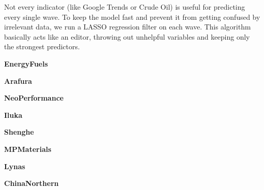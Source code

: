 \documentclass[11pt,a4paper]{article}
\begin{document}
Not every indicator (like Google Trends or Crude Oil) is useful for predicting every single wave. To keep the model fast and prevent it from getting confused by irrelevant data, we run a LASSO regression filter on each wave. This algorithm basically acts like an editor, throwing out unhelpful variables and keeping only the strongest predictors.

\begin{table}[H]
    \caption{LASSO Feature Selection Grid}
    \begin{minipage}{0.48\textwidth} \centering \textbf{EnergyFuels} \resizebox{\linewidth}{!}{  } \end{minipage}\hfill
    \begin{minipage}{0.48\textwidth} \centering \textbf{Arafura} \resizebox{\linewidth}{!}{  } \end{minipage}
    \vspace{0.5em}

    \begin{minipage}{0.48\textwidth} \centering \textbf{NeoPerformance} \resizebox{\linewidth}{!}{  } \end{minipage}\hfill
    \begin{minipage}{0.48\textwidth} \centering \textbf{Iluka} \resizebox{\linewidth}{!}{  } \end{minipage}
    \vspace{0.5em}

    \begin{minipage}{0.48\textwidth} \centering \textbf{Shenghe} \resizebox{\linewidth}{!}{  } \end{minipage}\hfill
    \begin{minipage}{0.48\textwidth} \centering \textbf{MPMaterials} \resizebox{\linewidth}{!}{  } \end{minipage}
    \vspace{0.5em}

    \begin{minipage}{0.48\textwidth} \centering \textbf{Lynas} \resizebox{\linewidth}{!}{  } \end{minipage}\hfill
    \begin{minipage}{0.48\textwidth} \centering \textbf{ChinaNorthern} \resizebox{\linewidth}{!}{  } \end{minipage}
    \vspace{0.5em}
\end{table}
\end{document}
